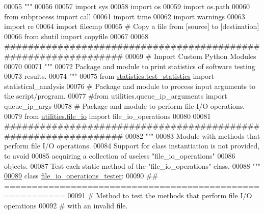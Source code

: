 \begin{DoxyCode}
00055 \textcolor{stringliteral}{"""}
00056 
00057 \textcolor{keyword}{import} sys
00058 \textcolor{keyword}{import} os
00059 \textcolor{keyword}{import} os.path
00060 \textcolor{keyword}{from} subprocess \textcolor{keyword}{import} call
00061 \textcolor{keyword}{import} time
00062 \textcolor{keyword}{import} warnings
00063 \textcolor{keyword}{import} re
00064 \textcolor{keyword}{import} filecmp
00065 \textcolor{comment}{# Copy a file from [source] to [destination]}
00066 \textcolor{keyword}{from} shutil \textcolor{keyword}{import} copyfile
00067 
00068 \textcolor{comment}{###############################################################}
00069 \textcolor{comment}{#   Import Custom Python Modules}
00070 
00071 \textcolor{stringliteral}{"""}
00072 \textcolor{stringliteral}{    Package and module to print statistics of software testing}
00073 \textcolor{stringliteral}{        results.}
00074 \textcolor{stringliteral}{"""}
00075 \textcolor{keyword}{from} \hyperlink{namespacestatistics_1_1test__statistics}{statistics.test\_statistics} \textcolor{keyword}{import} statistical\_analysis
00076 \textcolor{comment}{# Package and module to process input arguments to the script/program.}
00077 \textcolor{comment}{#from utilities.queue\_ip\_arguments import queue\_ip\_args}
00078 \textcolor{comment}{# Package and module to perform file I/O operations.}
00079 \textcolor{keyword}{from} \hyperlink{namespaceutilities_1_1file__io}{utilities.file\_io} \textcolor{keyword}{import} file\_io\_operations
00080 
00081 \textcolor{comment}{###############################################################}
00082 \textcolor{stringliteral}{"""}
00083 \textcolor{stringliteral}{    Module with methods that perform file I/O operations.}
00084 \textcolor{stringliteral}{    Support for class instantiation is not provided, to avoid}
00085 \textcolor{stringliteral}{        acquiring a collection of useless "file\_io\_operations"}
00086 \textcolor{stringliteral}{        objects.}
00087 \textcolor{stringliteral}{    Test each static method of the "file\_io\_operations" class.}
00088 \textcolor{stringliteral}{"""}
\hypertarget{file__io__tester_8py_source_l00089}{}\hyperlink{classutilities_1_1file__io__tester_1_1file__io__operations__tester}{00089} \textcolor{keyword}{class }\hyperlink{classutilities_1_1file__io__tester_1_1file__io__operations__tester}{file\_io\_operations\_tester}:
00090     \textcolor{comment}{## =========================================================}
00091     \textcolor{comment}{#   Method to test the methods that perform file I/O operations}
00092     \textcolor{comment}{#       with an invalid file.}

\end{DoxyCode}
